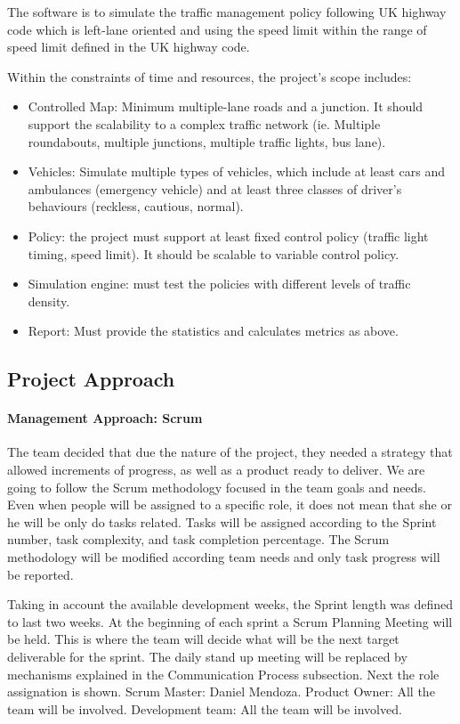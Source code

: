 \documentclass[11pt]{article}
\begin{document}
The software is to simulate the traffic management policy following UK highway code which is left-lane oriented and using the speed limit within the range of speed limit defined in the UK highway code.


Within the constraints of time and resources, the project’s scope includes:
\begin{itemize}
\item Controlled Map: Minimum multiple-lane roads and a junction. It should support the scalability to a complex traffic network (ie. Multiple roundabouts, multiple junctions, multiple traffic lights, bus lane).
\item Vehicles: Simulate multiple types of vehicles, which include at least cars and ambulances (emergency vehicle) and at least three classes of driver’s behaviours (reckless, cautious, normal).
\item Policy: the project must support at least fixed control policy (traffic light timing, speed limit). It should be scalable to variable control policy.
\item Simulation engine: must test the policies with different levels of traffic density.
\item Report: Must provide the statistics and calculates metrics as above.
\end{itemize}


\subsection{Project Approach}
	\paragraph{Management Approach: Scrum} The team decided that due the nature of the project, they needed a strategy that allowed increments of progress, as well as a product ready to deliver. We are going to follow the Scrum methodology focused in the team goals and needs. Even when people will be assigned to a specific role, it does not mean that she or he will be only do tasks related. Tasks will be assigned according to the Sprint number, task complexity, and task completion percentage. The Scrum methodology will be modified according team needs and only task progress will be reported.
		
	Taking in account the available development weeks, the Sprint length was defined to last two weeks. At the beginning of each sprint a Scrum Planning Meeting will be held. This is where the team will decide what will be the next target deliverable for the sprint. The daily stand up meeting will be replaced by mechanisms explained in the Communication Process subsection.
	Next the role assignation is shown. Scrum Master: Daniel Mendoza. Product Owner: All the team will be involved. Development team: All the team will be involved.
	
\end{document}
